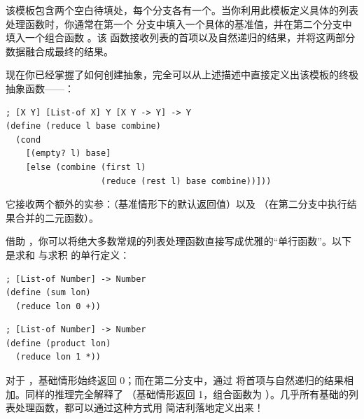 该模板包含两个空白待填处，每个分支各有一个。当你利用此模板定义具体的列表处理函数时，你通常在第一个  分支中填入一个具体的基准值，并在第二个分支中填入一个组合函数 。该  函数接收列表的首项以及自然递归的结果，并将这两部分数据融合成最终的结果。

现在你已经掌握了如何创建抽象，完全可以从上述描述中直接定义出该模板的终极抽象函数——：

\begin{lstlisting}[language=BSL, basicstyle=\scriptsize\ttfamily]
; [X Y] [List-of X] Y [X Y -> Y] -> Y
(define (reduce l base combine)
  (cond
    [(empty? l) base]
    [else (combine (first l)
                   (reduce (rest l) base combine))]))
\end{lstlisting}

它接收两个额外的实参：（基准情形下的默认返回值）以及 （在第二分支中执行结果合并的二元函数）。

借助 ，你可以将绝大多数常规的列表处理函数直接写成优雅的“单行函数”。以下是求和  与求积  的单行定义：

\begin{stepperbox}
  \noindent\begin{minipage}[t]{0.48\linewidth}\vspace{0pt}
\begin{Verbatim}[commandchars=\\\{\}, fontsize=\fontsize{6.0pt}{7.2pt}\selectfont]
; [List-of Number] -> Number
(define (sum lon)
  (reduce lon 0 +))
\end{Verbatim}
  \end{minipage}\hfill
  \begin{minipage}[t]{0.48\linewidth}\vspace{0pt}
\begin{Verbatim}[commandchars=\\\{\}, fontsize=\fontsize{6.0pt}{7.2pt}\selectfont]
; [List-of Number] -> Number
(define (product lon)
  (reduce lon 1 *))
\end{Verbatim}
  \end{minipage}
\end{stepperbox}

对于 ，基础情形始终返回 0；而在第二分支中，通过 \code{+} 将首项与自然递归的结果相加。同样的推理完全解释了 （基础情形返回 1，组合函数为 \code{*}）。几乎所有基础的列表处理函数，都可以通过这种方式用  简洁利落地定义出来！
